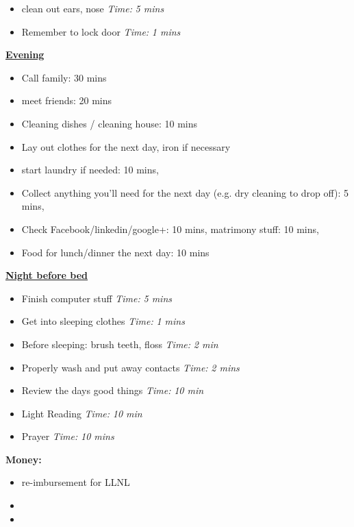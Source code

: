 \documentclass[11pt]{article}
\newcommand{\timeEst}[1]{\textit{Time:} \textit{#1}}
\begin{document}
{\begin{itemize}
                \item \tiny clean out ears, nose \timeEst{5 mins}
                \item \tiny Remember to lock door \timeEst{1 mins}
                \end{itemize}                 
                \underline{\textbf{Evening}}
                \begin{itemize}
                  \tiny \item \tiny Call family: 30 mins
                \item \tiny meet friends: 20 mins
                \item \tiny Cleaning dishes / cleaning house: 10 mins
                \item \tiny Lay out clothes for the next day, iron if necessary
                \item \tiny start laundry if needed: 10 mins,
                \item \tiny Collect anything you’ll need for the next day (e.g. dry cleaning to drop off): 5 mins,
                \item \tiny Check Facebook/linkedin/google+: 10 mins, matrimony stuff: 10 mins,
                \item \tiny Food for lunch/dinner the next day: 10 mins
                \end{itemize}

                \underline{\textbf{Night before bed}}
                \begin{itemize}
                  \tiny \item \tiny Finish computer stuff \timeEst{5 mins}
                \item \tiny Get into sleeping clothes \timeEst{1 mins}
                \item \tiny Before sleeping: brush teeth, floss \timeEst{ 2 min}
                \item \tiny Properly wash and put away contacts \timeEst{ 2 mins}
                \item \tiny Review the days good things \timeEst{ 10 min}
                \item \tiny Light Reading \timeEst{ 10 min}
                \item \tiny Prayer \timeEst{10 mins}
            \end{itemize} 
            \newpage
            
            \textbf{Money:}\\ 
            \begin{itemize} 
              \tiny \item \tiny re-imbursement for LLNL 
            \item \tiny 
            \item \tiny 
            \end{itemize} 


}
\end{document}
